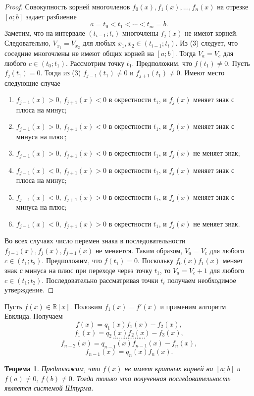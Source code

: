 \documentclass[12pt, titlepage, oneside]{amsbook}
\newcommand{\RR}{\mathbb{R}}
\newtheorem{theorem}{Теорема}[chapter]
\theoremstyle{definition}
\theoremstyle{remark}
\begin{document}
\begin{proof}
	Совокупность корней многочленов $f_0(x),f_1(x),\ldots,f_n(x)$ на отрезке $[a;b]$ задает разбиение $$a=t_0<t_1<\cdots<t_m=b.$$ Заметим, что на интервале $(t_{i-1};t_i)$ многочлены $f_j(x)$ не имеют корней. Следовательно, $V_{x_1}=V_{x_2}$ для любых $x_1,x_2\in (t_{i-1};t_i)$. Из (3) следует, что соседние многочлены не имеют общих корней на $[a;b]$. Тогда $V_a=V_c$ для любого $c\in(t_0;t_1)$. Рассмотрим точку $t_1$. Предположим, что $f(t_1)\neq 0$. Пусть $f_j(t_1)=0$. Тогда из (3) $f_{j-1}(t_1)\neq0$ и $f_{j+1}(t_1)\neq0$. Имеют место следующие случае
	\begin{enumerate}
		\item $f_{j-1}(x)>0$, $f_{j+1}(x)<0$ в окрестности $t_1$, и $f_j(x)$ меняет знак с плюса на минус;
		\item $f_{j-1}(x)>0$, $f_{j+1}(x)<0$ в окрестности $t_1$, и $f_j(x)$ меняет знак с минуса на плюс;
		\item $f_{j-1}(x)>0$, $f_{j+1}(x)<0$ в окрестности $t_1$, и $f_j(x)$ не меняет знак;
		\item $f_{j-1}(x)<0$, $f_{j+1}(x)>0$ в окрестности $t_1$, и $f_j(x)$ меняет знак с плюса на минус;
		\item $f_{j-1}(x)<0$, $f_{j+1}(x)>0$ в окрестности $t_1$, и $f_j(x)$ меняет знак с минуса на плюс;
		\item $f_{j-1}(x)<0$, $f_{j+1}(x)>0$ в окрестности $t_1$, и $f_j(x)$ не меняет знак.
	\end{enumerate}
	Во всех случаях число перемен знака в последовательности $f_{j-1}(x),f_j(x),f_{j+1}(x)$ не меняется. Таким образом, $V_a=V_c$ для любого $c\in(t_1;t_2)$. Предположим, что $f(t_1)=0$. Поскольку $f_0(x)f_1(x)$ меняет знак с минуса на плюс при переходе через точку $t_1$, то $V_a=V_c+1$ для любого $c\in(t_1;t_2)$. Последовательно рассматривая точки $t_i$ получаем необходимое утверждение.
\end{proof}

Пусть $f(x)\in\RR[x]$. Положим $f_1(x)=f'(x)$ и применим алгоритм Евклида. Получаем $$f(x)=q_1(x)f_1(x)-f_2(x),$$ $$f_1(x)=q_2(x)f_2(x)-f_3(x),$$ $$\cdots\cdots\cdots\cdots\cdots\cdots$$ $$f_{n-2}(x)=q_{n-1}(x)f_{n-1}(x)-f_n(x),$$ $$f_{n-1}(x)=q_n(x)f_n(x).$$


\begin{theorem}
	\label{Sht2}
	Предположим, что $f(x)$ не имеет кратных корней на $[a;b]$ и $f(a)\neq 0$, $f(b)\neq 0$. Тогда только что полученная последовательность является системой Штурма.
\end{theorem}
\end{document}
